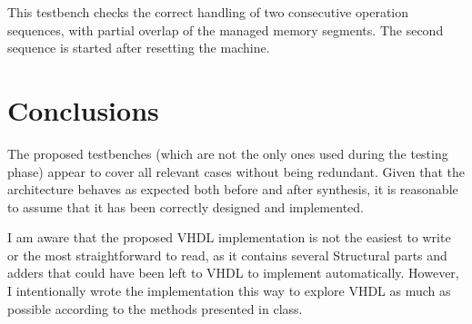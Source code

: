 \documentclass{article}
\begin{document}
This testbench checks the correct handling of two consecutive operation sequences, with partial overlap of the managed memory segments. The second sequence is started after resetting the machine.

\section{Conclusions}
The proposed testbenches (which are not the only ones used during the testing phase) appear to cover all relevant cases without being redundant. Given that the architecture behaves as expected both before and after synthesis, it is reasonable to assume that it has been correctly designed and implemented.

I am aware that the proposed VHDL implementation is not the easiest to write or the most straightforward to read, as it contains several Structural parts and adders that could have been left to VHDL to implement automatically. However, I intentionally wrote the implementation this way to explore VHDL as much as possible according to the methods presented in class.
\end{document}

